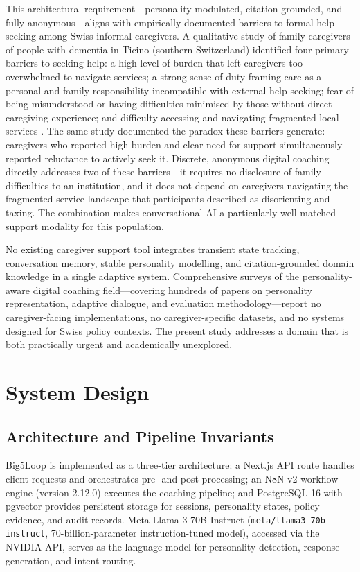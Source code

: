 \documentclass[10pt,a4paper]{report}
\begin{document}
This architectural requirement---personality-modulated, citation-grounded, and fully anonymous---aligns with empirically documented barriers to formal help-seeking among Swiss informal caregivers. A qualitative study of family caregivers of people with dementia in Ticino (southern Switzerland) identified four primary barriers to seeking help: a high level of burden that left caregivers too overwhelmed to navigate services; a strong sense of duty framing care as a personal and family responsibility incompatible with external help-seeking; fear of being misunderstood or having difficulties minimised by those without direct caregiving experience; and difficulty accessing and navigating fragmented local services \citep{Messina2022}. The same study documented the paradox these barriers generate: caregivers who reported high burden and clear need for support simultaneously reported reluctance to actively seek it. Discrete, anonymous digital coaching directly addresses two of these barriers---it requires no disclosure of family difficulties to an institution, and it does not depend on caregivers navigating the fragmented service landscape that participants described as disorienting and taxing. The combination makes conversational AI a particularly well-matched support modality for this population.

No existing caregiver support tool integrates transient state tracking, conversation memory, stable personality modelling, and citation-grounded domain knowledge in a single adaptive system. Comprehensive surveys of the personality-aware digital coaching field---covering hundreds of papers on personality representation, adaptive dialogue, and evaluation methodology---report no caregiver-facing implementations, no caregiver-specific datasets, and no systems designed for Swiss policy contexts. The present study addresses a domain that is both practically urgent and academically unexplored.

\chapter{System Design}
\label{ch:system}

\section{Architecture and Pipeline Invariants}

Big5Loop is implemented as a three-tier architecture: a Next.js API route handles client requests and orchestrates pre- and post-processing; an N8N v2 workflow engine (version 2.12.0) executes the coaching pipeline; and PostgreSQL 16 with pgvector provides persistent storage for sessions, personality states, policy evidence, and audit records. Meta Llama 3 70B Instruct \citep{Dubey2024} (\texttt{meta/llama3-70b-instruct}, 70-billion-parameter instruction-tuned model), accessed via the NVIDIA API, serves as the language model for personality detection, response generation, and intent routing.
\end{document}
